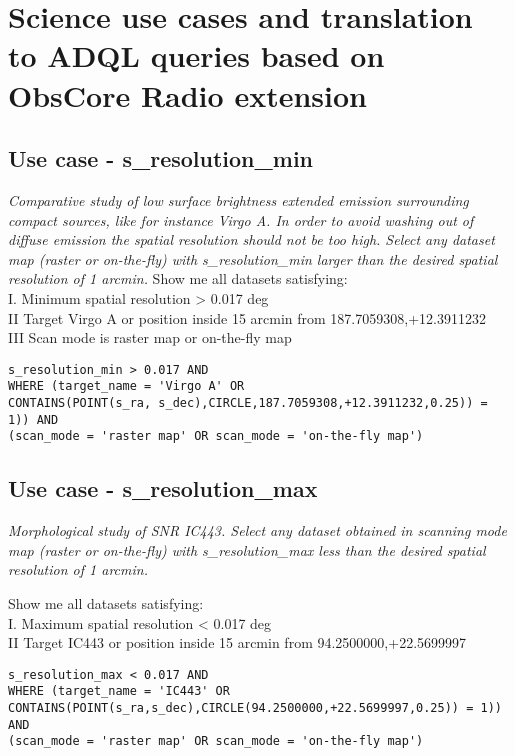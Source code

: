 \section{Science use cases and translation to ADQL queries  based on ObsCore Radio extension  }
\label{ADQLusecases}

\subsection{Use case - s\_resolution\_min}
\textit{Comparative study of low surface brightness extended emission surrounding compact sources, like for instance Virgo A.
In order to avoid washing out of diffuse emission the spatial resolution should not be too high.
Select any dataset map (raster or on-the-fly) with s\_resolution\_min larger than the desired spatial resolution of 1 arcmin.}
Show me all datasets satisfying: \\
I. Minimum spatial resolution > 0.017 deg \\
II Target Virgo A or position inside 15 arcmin from 187.7059308,+12.3911232 \\
III Scan mode is raster map or on-the-fly map

\begin{verbatim}
s_resolution_min > 0.017 AND
WHERE (target_name = 'Virgo A' OR
CONTAINS(POINT(s_ra, s_dec),CIRCLE,187.7059308,+12.3911232,0.25)) = 1)) AND
(scan_mode = 'raster map' OR scan_mode = 'on-the-fly map')
\end{verbatim}

\subsection{Use case - s\_resolution\_max}
\textit{Morphological study of SNR IC443. Select any dataset obtained in scanning mode map (raster or on-the-fly) with s\_resolution\_max less than the desired spatial resolution of 1 arcmin.}

Show me all datasets satisfying: \\
I. Maximum spatial resolution < 0.017 deg \\
II Target IC443 or position inside 15 arcmin from 94.2500000,+22.5699997 \\

\begin{verbatim}
s_resolution_max < 0.017 AND
WHERE (target_name = 'IC443' OR
CONTAINS(POINT(s_ra,s_dec),CIRCLE(94.2500000,+22.5699997,0.25)) = 1)) AND
(scan_mode = 'raster map' OR scan_mode = 'on-the-fly map')
\end{verbatim}

